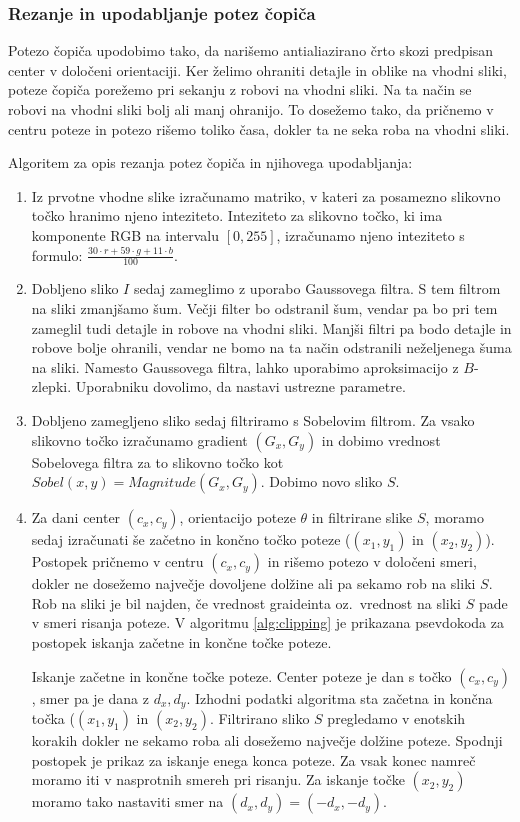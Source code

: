 \subsubsection{Rezanje in upodabljanje potez čopiča}
Potezo čopiča upodobimo tako, da narišemo antialiazirano črto skozi predpisan center v določeni orientaciji. Ker želimo ohraniti detajle in oblike na vhodni sliki, poteze čopiča porežemo pri sekanju z robovi na vhodni sliki. Na ta način se robovi na vhodni sliki bolj ali manj ohranijo. To dosežemo tako, da pričnemo v centru poteze in potezo rišemo toliko časa, dokler ta ne seka roba na vhodni sliki.

Algoritem za opis rezanja potez čopiča in njihovega upodabljanja:
%
\begin{enumerate}
  \item Iz prvotne vhodne slike izračunamo matriko, v kateri za posamezno slikovno točko hranimo njeno inteziteto. Inteziteto za slikovno točko, ki ima komponente RGB na intervalu $[0, 255]$, izračunamo njeno inteziteto s formulo:
$\frac{30\cdot r + 59 \cdot g + 11\cdot b}{100}$.
  \item Dobljeno sliko $I$ sedaj zameglimo z uporabo Gaussovega filtra. S tem filtrom na sliki zmanjšamo šum. Večji filter bo odstranil šum, vendar pa bo pri tem zameglil tudi detajle in robove na vhodni sliki. Manjši filtri pa bodo detajle in robove bolje ohranili, vendar ne bomo na ta način odstranili neželjenega šuma na sliki. Namesto Gaussovega filtra, lahko uporabimo aproksimacijo z $B$-zlepki. Uporabniku dovolimo, da nastavi ustrezne parametre.
  \item Dobljeno zamegljeno sliko sedaj filtriramo s Sobelovim filtrom. Za vsako slikovno točko izračunamo gradient $(G_x, G_y)$ in dobimo vrednost Sobelovega filtra za to slikovno točko kot
$Sobel(x, y) = Magnitude(G_x, G_y)$.
Dobimo novo sliko $S$.
  \item Za dani center $(c_x, c_y)$, orientacijo poteze $\theta$ in filtrirane slike $S$, moramo sedaj izračunati še začetno in končno točko poteze ($(x_1, y_1)$ in $(x_2, y_2)$). Postopek pričnemo v centru $(c_x, c_y)$ in rišemo potezo v določeni smeri, dokler ne dosežemo največje dovoljene dolžine ali pa sekamo rob na sliki $S$. Rob na sliki je bil najden, če vrednost graideinta oz.\ vrednost na sliki $S$ pade v smeri risanja poteze. V algoritmu \ref{alg:clipping} je prikazana psevdokoda za postopek iskanja začetne in končne točke poteze.
%
\begin{algorithm}
  \caption{Iskanje začetne in končne točke poteze. Center poteze je dan s točko $(c_x, c_y)$, smer pa je dana z $d_x, d_y$. Izhodni podatki algoritma sta začetna in končna točka ($(x_1, y_1)$ in $(x_2, y_2)$. Filtrirano sliko $S$ pregledamo v enotskih korakih dokler ne sekamo roba ali dosežemo največje dolžine poteze. Spodnji postopek je prikaz za iskanje enega konca poteze. Za vsak konec namreč moramo iti v nasprotnih smereh pri risanju. Za iskanje točke $(x_2, y_2)$ moramo tako nastaviti smer na $(d_x, d_y) = (-d_x, -d_y)$.}

\end{algorithm}
\end{enumerate}
